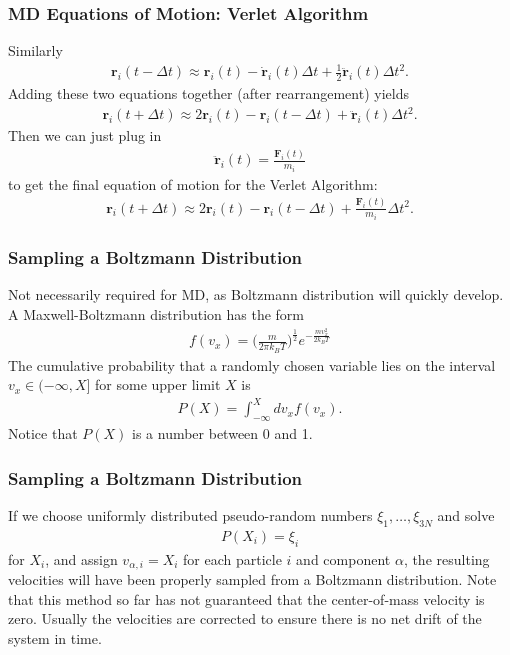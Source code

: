 \documentclass{beamer}
\newenvironment{noheadline}{
	\setbeamertemplate{headline}{}
	\addtobeamertemplate{frametitle}{\vspace*{-0.9\baselineskip}}{}
}{}
\begin{document}
\begin{noheadline}
\begin{frame}
\frametitle{MD Equations of Motion: Verlet Algorithm}
Similarly
\begin{align*}
\mathbf{r}_{i}(t - \Delta t) \approx \mathbf{r}_{i}(t) - \dot{\mathbf{r}}_{i}(t)\Delta t + \frac{1}{2}\ddot{\mathbf{r}}_{i}(t)\Delta t^{2}.
\end{align*}
Adding these two equations together (after rearrangement) yields
\begin{align*}
\mathbf{r}_{i}(t + \Delta t) \approx 2 \mathbf{r}_{i}(t) - \mathbf{r}_{i}(t - \Delta t) + \ddot{\mathbf{r}}_{i}(t)\Delta t^{2}.
\end{align*}
Then we can just plug in 
\begin{align*}
\ddot{\mathbf{r}}_{i}(t) = \frac{\mathbf{F}_{i}(t)}{m_{i}}
\end{align*}
to get the final equation of motion for the Verlet Algorithm:
\begin{align*}
\mathbf{r}_{i}(t + \Delta t) \approx 2 \mathbf{r}_{i}(t) - \mathbf{r}_{i}(t - \Delta t) +\frac{\mathbf{F}_{i}(t)}{m_{i}} \Delta t^{2}.
\end{align*}
\end{frame}

\begin{frame}
\frametitle{Sampling a Boltzmann Distribution}
Not necessarily required for MD, as Boltzmann distribution will quickly develop. A Maxwell-Boltzmann distribution has the form
\begin{align*}
f(v_{x}) = \bigg( \frac{m}{2\pi k_{B} T} \bigg)^{\frac{1}{2}} e^{-\frac{m v_{x}^{2}}{2 k_{B} T}}
\end{align*}
The cumulative probability that a randomly chosen variable lies on the interval $v_{x} \in (-\infty,X]$ for some upper limit $X$ is
\begin{align*}
P(X) = \int_{-\infty}^{X}dv_{x} f(v_{x}). 
\end{align*}
Notice that $P(X)$ is a number between 0 and 1.
\end{frame}

\begin{frame}
\frametitle{Sampling a Boltzmann Distribution}
If we choose uniformly distributed pseudo-random numbers $\xi_{1}, \ldots, \xi_{3N}$ and solve
\begin{align*}
P(X_{i}) = \xi_{i}
\end{align*}
for $X_{i}$, and assign $v_{\alpha,i} = X_{i}$ for each particle $i$ and component $\alpha$, the resulting velocities will have been properly sampled from a Boltzmann distribution. Note that this method so far has not guaranteed that the center-of-mass velocity is zero. Usually the velocities are corrected to ensure there is no net drift of the system in time.\\


\end{frame}
\end{noheadline}
\end{document}
